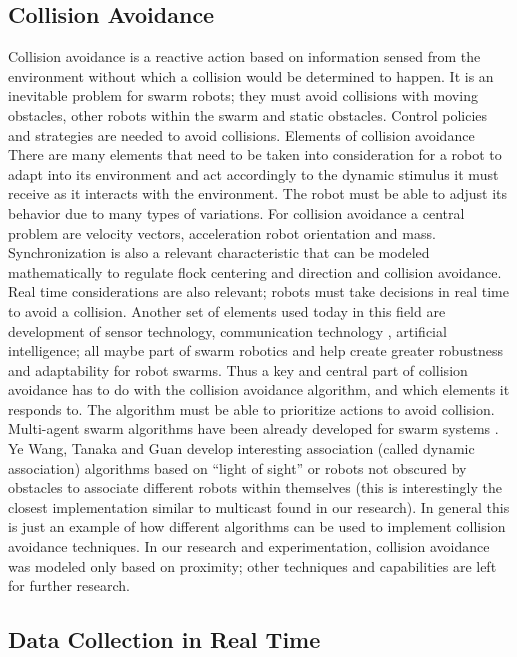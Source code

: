 \documentclass[journal]{IEEEtran}
\begin{document}
\subsection{Collision Avoidance}
Collision avoidance is a reactive action based on information sensed from the environment without which a collision would be determined to happen. It is an inevitable problem for swarm robots; they must avoid collisions with moving obstacles, other robots within the swarm and static obstacles. Control policies and strategies \cite{IG6} are needed to avoid collisions. 
Elements of collision avoidance
There are many elements that need to be taken into consideration for a robot to adapt into its environment and act accordingly to the dynamic stimulus it must receive as it interacts with the environment. The robot must be able to adjust its behavior due to many types of variations. For collision avoidance a central problem are velocity vectors, acceleration \cite{IG9} robot orientation \cite{IG7} and mass. Synchronization \cite{IG8} is also a relevant characteristic that can be modeled mathematically \cite{IG8} to regulate flock centering and direction and collision avoidance.
Real time considerations are also relevant; robots must take decisions in real time to avoid a collision. 
Another set of elements used today in this field are development of sensor technology, communication technology , artificial intelligence; all maybe part of swarm robotics and help create greater robustness and adaptability for robot swarms.
Thus a key and central part of collision avoidance has to do with the collision avoidance algorithm, and which elements it responds to. The algorithm must be able to prioritize actions to avoid collision.  Multi-agent swarm algorithms have been already developed for swarm systems \cite{IG10}. Ye Wang, Tanaka and Guan \cite{IG10} develop interesting association (called dynamic association) algorithms based on “light of sight” or robots not obscured by obstacles to associate different robots within themselves (this is interestingly the closest implementation similar to multicast found in our research). In general this is just an example of how different algorithms can be used to implement collision avoidance techniques. In our research and experimentation, collision avoidance was modeled only based on proximity; other techniques and capabilities are left for further research.

\subsection{Data Collection in Real Time}
\end{document}
